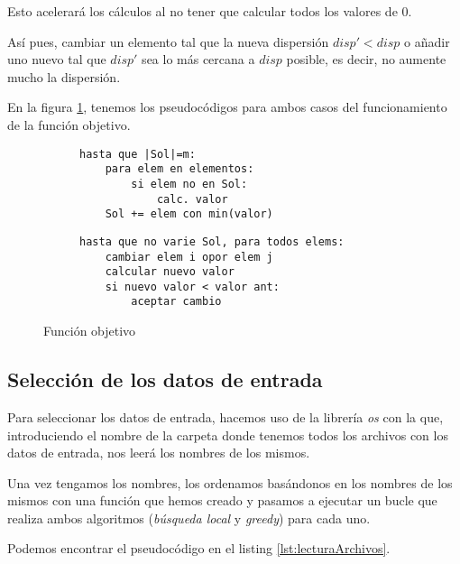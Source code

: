 Esto acelerará los cálculos al no tener que calcular todos los valores de 0.

Así pues, cambiar un elemento tal que la nueva dispersión $\displaystyle disp' < disp$ o añadir uno nuevo tal que $disp'$ sea lo más cercana a $disp$ posible, es decir, no aumente mucho la dispersión.

En la figura \ref{fig:fObjetivo}, tenemos los pseudocódigos para ambos casos del funcionamiento de la función objetivo.

\begin{figure}[H]
    \centering
    \begin{subfigure}[b]{0.49\textwidth}
\begin{lstlisting}[caption={Versión greedy}, captionpos=b]
hasta que |Sol|=m:
    para elem en elementos:
        si elem no en Sol:
            calc. valor
    Sol += elem con min(valor)
\end{lstlisting}
    \end{subfigure}
    \begin{subfigure}[b]{0.49\textwidth}
\begin{lstlisting}[caption={Versión búsqueda local}, captionpos=b]
hasta que no varie Sol, para todos elems:
    cambiar elem i opor elem j
    calcular nuevo valor
    si nuevo valor < valor ant:
        aceptar cambio
\end{lstlisting}
    \end{subfigure}
    
\caption{Función objetivo}
\label{fig:fObjetivo}

\end{figure}


\subsection{Selección de los datos de entrada}

Para seleccionar los datos de entrada, hacemos uso de la librería \textit{os} con la que, introduciendo el nombre de la carpeta donde tenemos todos los archivos con los datos de entrada, nos leerá los nombres de los mismos.

Una vez tengamos los nombres, los ordenamos basándonos en los nombres de los mismos con una función que hemos creado y pasamos a ejecutar un bucle que realiza ambos algoritmos (\textit{búsqueda local} y \textit{greedy}) para cada uno.

Podemos encontrar el pseudocódigo en el listing \ref{lst:lecturaArchivos}.

